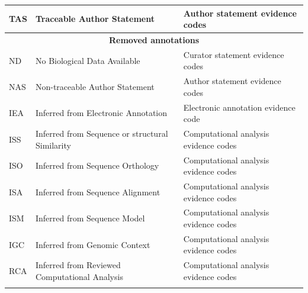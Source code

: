 \documentclass[ijms,article,accept,moreauthors,pdftex]{Definitions/mdpi}
\begin{document}
\begin{paracol}{2}
\begin{specialtable}[H]
{\begin{tabular}{lll}
TAS                                                              & Traceable Author Statement                                    & Author statement evidence codes                              \\\hline
\multicolumn{3}{c}{\textbf{Removed annotations}}                                                                                                                                                \\\hline
\rowcolor[HTML]{C0C0C0} 
ND                                                               & No Biological Data Available                                  & Curator statement evidence codes                             \\
NAS                                                              & Non-traceable Author Statement                                & Author statement evidence codes                              \\
\rowcolor[HTML]{C0C0C0} 
IEA                                                              & Inferred from Electronic Annotation                           & Electronic annotation evidence code                          \\
ISS                                                              & Inferred from Sequence or structural Similarity               & Computational analysis evidence codes                        \\
\rowcolor[HTML]{C0C0C0} 
ISO                                                              & Inferred from Sequence Orthology                              & Computational analysis evidence codes                        \\
ISA                                                              & Inferred from Sequence Alignment                              & Computational analysis evidence codes                        \\
\rowcolor[HTML]{C0C0C0} 
ISM                                                              & Inferred from Sequence Model                                  & Computational analysis evidence codes                        \\
IGC                                                              & Inferred from Genomic Context                                 & Computational analysis evidence codes                        \\
\rowcolor[HTML]{C0C0C0} 
RCA                                                              & Inferred from Reviewed Computational Analysis & Computational analysis evidence codes\\ \noalign{\hrule height 1.0pt}
\end{tabular}%
}
\end{specialtable}
\unskip


\end{paracol}
\end{document}
